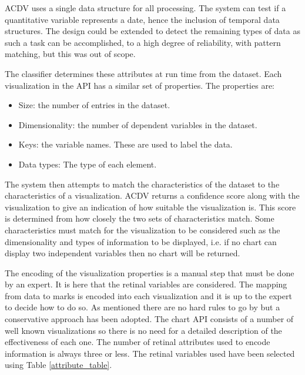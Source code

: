 \documentclass[a4paper, 11pt, titlepage, onehalfspacing]{report}
\begin{document}
AC\lightning{}DV uses a single data structure for all processing. The system can test if a quantitative variable represents a date, hence the inclusion of temporal data structures. The design could be extended to detect the remaining types of data as such a task can be accomplished, to a high degree of reliability, with pattern matching, but this was out of scope.

The classifier determines these attributes at run time from the dataset. Each visualization in the API has a similar set of properties. The properties are:
\begin{itemize}
\item Size: the number of entries in the dataset.
\item Dimensionality: the number of dependent variables in the dataset.
\item Keys: the variable names. These are used to label the data.
\item Data types: The type of each element. 
\end{itemize}
The system then attempts to match the characteristics of the dataset to the characteristics of a visualization. AC\lightning{}DV returns a confidence score along with the visualization to give an indication of how suitable the visualization is. This score is determined from how closely the two sets of characteristics match. Some characteristics must match for the visualization to be considered such as the dimensionality and types of information to be displayed, i.e. if no chart can display two independent variables then no chart will be returned.

The encoding of the visualization properties is a manual step that must be done by an expert. It is here that the retinal variables are considered. The mapping from data to marks is encoded into each visualization and it is up to the expert to decide how to do so. As mentioned there are no hard rules to go by but a conservative approach has been adopted. The chart API consists of a number of well known visualizations so there is no need for a detailed description of the effectiveness of each one. The number of retinal attributes used to encode information is always three or less. The retinal variables used have been selected using Table \ref{attribute_table}.
\end{document}
